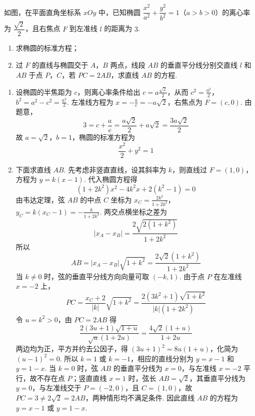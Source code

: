 \begin{problem}
如图，在平面直角坐标系 \(xOy\) 中，已知椭圆 \(\dfrac{x^2}{a^2} + \dfrac{y^2}{b^2} = 1\)（\(a > b > 0\)）的离心率为 \(\dfrac{\sqrt{2}}{2}\)，且右焦点 \(F\) 到左准线 \(l\) 的距离为 \(3\).

\begin{enumerate}
\item 求椭圆的标准方程；
\item 过 \(F\) 的直线与椭圆交于 \(A\)，\(B\) 两点，线段 \(AB\) 的垂直平分线分别交直线 \(l\) 和 \(AB\) 于点 \(P\)，\(C\)，若 \(PC = 2AB\)，求直线 \(AB\) 的方程.
\end{enumerate}

\end{problem}

\begin{solution}
\begin{enumerate}
\item
设椭圆的半焦距为 \(c\)，则离心率条件给出 \(c=a\frac{\sqrt2}{2}\)，从而 \(c^{2}=\frac{a^{2}}2\)，\(b^{2}=a^{2}-c^{2}=\frac{a^{2}}2\). 左准线方程为 \(x=-\frac{a}{e}=-a\sqrt2\)，右焦点为 \(F=(c,0)\). 由题意，
\[
3=c+\frac{a}{e}=\frac{a\sqrt2}{2}+a\sqrt2=\frac{3a\sqrt2}{2}
\]
故 \(a=\sqrt2\)，\(b=1\)，椭圆的标准方程为
\[
\frac{x^{2}}2+y^{2}=1
\]

\item
下面求直线 \(AB\). 先考虑非竖直直线，设其斜率为 \(k\)，则直线过 \(F=(1,0)\)，方程为 \(y=k(x-1)\). 代入椭圆方程得
\[
(1+2k^{2})x^{2}-4k^{2}x+2(k^{2}-1)=0
\]
由韦达定理，弦 \(AB\) 的中点 \(C\) 坐标为 \(x_C=\frac{2k^{2}}{1+2k^{2}}\)，\(y_C=k(x_C-1)=-\frac{k}{1+2k^{2}}\).
两交点横坐标之差为
\[
|x_A-x_B|=\frac{2\sqrt{2(1+k^{2})}}{1+2k^{2}}
\]
所以
\[
AB=|x_A-x_B|\sqrt{1+k^{2}}=\frac{2\sqrt2(1+k^{2})}{1+2k^{2}}
\]
当 \(k\neq0\) 时，弦的垂直平分线方向向量可取 \((-k,1)\). 由于点 \(P\) 在左准线 \(x=-2\) 上，
\[
PC=\frac{x_C+2}{|k|}\sqrt{1+k^{2}}=\frac{2(3k^{2}+1)\sqrt{1+k^{2}}}{|k|(1+2k^{2})}
\]
令 \(u=k^{2}>0\)，由 \(PC=2AB\) 得
\[
\frac{2(3u+1)\sqrt{1+u}}{\sqrt u(1+2u)}=\frac{4\sqrt2(1+u)}{1+2u}
\]
两边均为正，平方并约去公因子，得 \((3u+1)^{2}=8u(1+u)\)，化简为 \((u-1)^{2}=0\).
所以 \(k=1\) 或 \(k=-1\)，相应的直线分别为 \(y=x-1\) 和 \(y=1-x\). 当 \(k=0\) 时，弦 \(AB\) 的垂直平分线为 \(x=0\)，与左准线 \(x=-2\) 平行，故不存在点 \(P\)；竖直直线 \(x=1\) 时，弦长 \(AB=\sqrt2\)，其垂直平分线为 \(y=0\)，与左准线交于 \(P=(-2,0)\)，且 \(C=(1,0)\)，故 \(PC=3\neq2\sqrt2=2AB\)，两种情形均不满足条件. 因此直线 \(AB\) 的方程为 \(y=x-1\) 或 \(y=1-x\).
\end{enumerate}
\end{solution}

